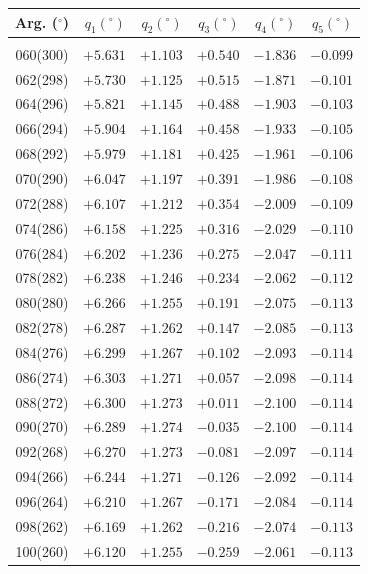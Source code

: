 \clearpage
\begin{table}[!h]\centering
\vspace{0.25cm}
 \begin{tabular}{crrrrr}
Arg. ($^\circ$) & $q_1(^\circ)$  & $q_2(^\circ)$ & $q_3(^\circ)$ & $q_4(^\circ)$  & $q_5(^\circ)$  \\\hline
&&&&&\\[-1.75ex]
060(300) & $+5.631$ & $+1.103$ & $+0.540$ & $-1.836$ & $-0.099$ \\ 
062(298) & $+5.730$ & $+1.125$ & $+0.515$ & $-1.871$ & $-0.101$ \\
064(296) & $+5.821$ & $+1.145$ & $+0.488$ & $-1.903$ & $-0.103$ \\ 
066(294) & $+5.904$ & $+1.164$ & $+0.458$ & $-1.933$ & $-0.105$ \\ 
068(292) & $+5.979$ & $+1.181$ & $+0.425$ & $-1.961$ & $-0.106$ \\ 
070(290) & $+6.047$ & $+1.197$ & $+0.391$ & $-1.986$ & $-0.108$ \\ 
072(288) & $+6.107$ & $+1.212$ & $+0.354$ & $-2.009$ & $-0.109$ \\ 
074(286) & $+6.158$ & $+1.225$ & $+0.316$ & $-2.029$ & $-0.110$ \\ 
076(284) & $+6.202$ & $+1.236$ & $+0.275$ & $-2.047$ & $-0.111$ \\ 
078(282) & $+6.238$ & $+1.246$ & $+0.234$ & $-2.062$ & $-0.112$ \\ 
080(280) & $+6.266$ & $+1.255$ & $+0.191$ & $-2.075$ & $-0.113$ \\
082(278) & $+6.287$ & $+1.262$ & $+0.147$ & $-2.085$ & $-0.113$ \\ 
084(276) & $+6.299$ & $+1.267$ & $+0.102$ & $-2.093$ & $-0.114$ \\ 
086(274) & $+6.303$ & $+1.271$ & $+0.057$ & $-2.098$ & $-0.114$ \\ 
088(272) & $+6.300$ & $+1.273$ & $+0.011$ & $-2.100$ & $-0.114$ \\ 
090(270) & $+6.289$ & $+1.274$ & $-0.035$ & $-2.100$ & $-0.114$ \\ 
092(268) & $+6.270$ & $+1.273$ & $-0.081$ & $-2.097$ & $-0.114$\\
094(266) & $+6.244$ & $+1.271$ & $-0.126$ & $-2.092$ & $-0.114$\\
096(264) & $+6.210$ & $+1.267$ & $-0.171$ & $-2.084$ & $-0.114$\\
098(262) & $+6.169$ & $+1.262$ & $-0.216$ & $-2.074$ & $-0.113$\\
100(260) & $+6.120$ & $+1.255$ & $-0.259$ & $-2.061$ & $-0.113$\\

\end{tabular}
\end{table}
